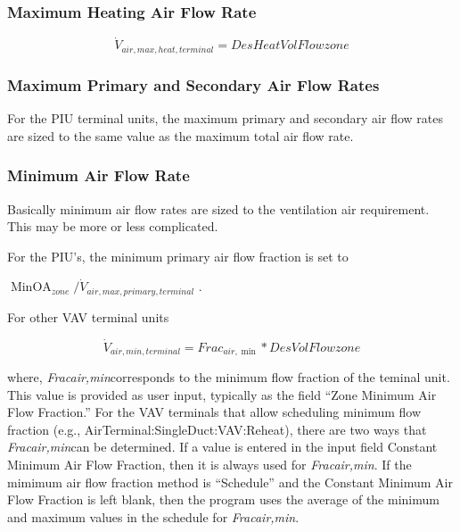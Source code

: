 \subsubsection{Maximum Heating Air Flow Rate}\label{maximum-heating-air-flow-rate}

\begin{equation}
{\dot V_{air,max,heat,terminal}} = DesHeatVolFlowzone
\end{equation}

\subsubsection{Maximum Primary and Secondary Air Flow Rates}\label{maximum-primary-and-secondary-air-flow-rates}

For the PIU terminal units, the maximum primary and secondary air flow rates are sized to the same value as the maximum total air flow rate.

\subsubsection{Minimum Air Flow Rate}\label{minimum-air-flow-rate}

Basically minimum air flow rates are sized to the ventilation air requirement. This may be more or less complicated.

For the PIU's, the minimum primary air flow fraction is set to

\(\mathop {MinOA}\nolimits_{zone} /{\dot V_{air,max,primary,terminal}}\) .

For other VAV terminal units

\begin{equation}
{\dot V_{air,min,terminal}} = Fra{c_{air,\min }}*DesVolFlowzone
\end{equation}

where, \emph{Fracair,min}corresponds to the minimum flow fraction of the teminal unit. This value is provided as user input, typically as the field ``Zone Minimum Air Flow Fraction.'' For the VAV terminals that allow scheduling minimum flow fraction (e.g., AirTerminal:SingleDuct:VAV:Reheat), there are two ways that \emph{Fracair,min}can be determined. If a value is entered in the input field Constant Minimum Air Flow Fraction, then it is always used for \emph{Fracair,min}. If the mimimum air flow fraction method is ``Schedule'' and the Constant Minimum Air Flow Fraction is left blank, then the program uses the average of the minimum and maximum values in the schedule for \emph{Fracair,min}.

